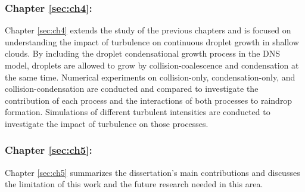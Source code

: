 \subsubsection{Chapter \ref{sec:ch4}: }
Chapter \ref{sec:ch4} extends the study of the previous chapters and is focused on understanding the impact of turbulence on continuous droplet growth in shallow clouds. By including the droplet condensational growth process in the DNS model, droplets are allowed to grow by collision-coalescence and condensation at the same time. Numerical experiments on collision-only, condensation-only, and collision-condensation are conducted and compared to investigate the contribution of each process and the interactions of both processes to raindrop formation. Simulations of different turbulent intensities are conducted to investigate the impact of turbulence on those processes. 

\subsubsection{Chapter \ref{sec:ch5}:}
Chapter \ref{sec:ch5} summarizes the dissertation's main contributions and discusses the limitation of this work and the future research needed in this area.
